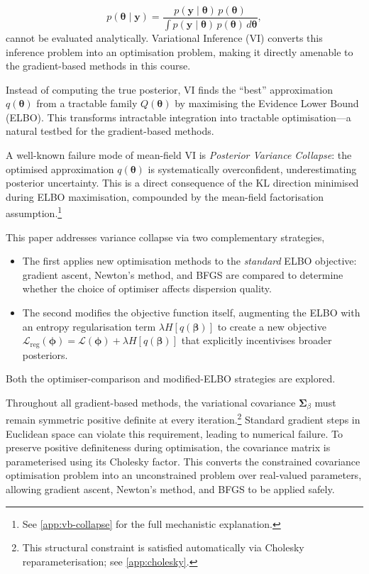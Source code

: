 \documentclass[11pt,a4paper]{article}
\begin{document}
\begin{equation*}
    p(\bm{\theta} \mid \bm{y}) = \frac{p(\bm{y} \mid \bm{\theta})\,p(\bm{\theta})}{\displaystyle\int p(\bm{y} \mid \bm{\theta})\,p(\bm{\theta})\, d\bm{\theta}},
\end{equation*}
\noindent 
cannot be evaluated analytically. 
Variational Inference (VI) converts this inference problem into an optimisation problem, making it directly amenable to the gradient-based methods in this course. \vspace{2em}

Instead of computing the true posterior, VI finds the ``best'' approximation $q(\bm{\theta})$ from a tractable family $Q(\bm{\theta})$
by maximising the Evidence Lower Bound (ELBO). 
This transforms intractable integration into tractable optimisation---a natural testbed for the gradient-based methods. \vspace{2em} 

A well-known failure mode of mean-field VI is \emph{Posterior Variance Collapse}: 
the optimised approximation $q(\bm{\theta})$ is systematically overconfident, 
underestimating posterior uncertainty. This is a direct consequence of the KL direction minimised during ELBO maximisation, 
compounded by the mean-field factorisation assumption.\footnote{See \ref{app:vb-collapse} for the full mechanistic explanation.}  \vspace{2em} 

This paper addresses variance collapse via two complementary strategies, 
\begin{itemize}
\item The first applies new optimisation methods to the \emph{standard} ELBO objective: gradient ascent, Newton's method, and BFGS are compared to determine whether the choice of optimiser affects dispersion quality.
\item The second modifies the objective function itself, augmenting the ELBO with an entropy regularisation term $\lambda H[q(\bm{\beta})]$ to create a new objective $\mathcal{L}_{\mathrm{reg}}(\bm{\phi}) = \mathcal{L}(\bm{\phi}) + \lambda H[q(\bm{\beta})]$ that explicitly incentivises broader posteriors.
\end{itemize}
Both the optimiser-comparison and modified-ELBO strategies are explored.  \vspace{2em} 

Throughout all gradient-based methods, the variational covariance $\bm{\Sigma}_\beta$ must remain symmetric positive definite at every iteration.\footnote{This structural constraint is satisfied automatically via Cholesky reparameterisation; see \ref{app:cholesky}. 
} 
Standard gradient steps in Euclidean space can violate this requirement, leading to numerical failure. To preserve positive definiteness during optimisation, the covariance matrix is parameterised using its Cholesky factor. This converts the constrained covariance optimisation problem into an unconstrained problem over real-valued parameters, allowing gradient ascent, Newton's method, and BFGS to be applied safely.
\end{document}
